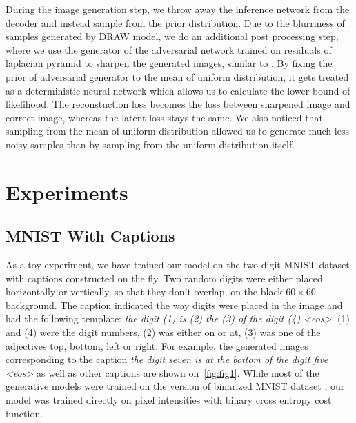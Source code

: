 \documentclass{article} %
\begin{document}
During the image generation step, we throw away the inference network from the decoder and instead sample from the prior distribution. Due to the blurriness of samples generated by DRAW model, we do an additional post processing step, where we use the generator of the adversarial network trained on residuals of laplacian pyramid to sharpen the generated images, similar to \citep{denton_lapgan}. By fixing the prior of adversarial generator to the mean of uniform distribution, it gets treated as a deterministic neural network which allows us to calculate the lower bound of likelihood. The reconstuction loss becomes the loss between sharpened image and correct image, whereas the latent loss stays the same. We also noticed that sampling from the mean of uniform distribution allowed us to generate much less noisy samples than by sampling from the uniform distribution itself.  

\section{Experiments}
\subsection{MNIST With Captions}
As a toy experiment, we have trained our model on the two digit MNIST dataset with captions constructed on the fly. Two random digits were either placed horizontally or vertically, so that they don't overlap, on the black $60 \times 60$ background. The caption indicated the way digits were placed in the image and had the following template: \textit{the digit (1) is (2) the (3) of the digit (4) \textless eos\textgreater}. (1) and (4) were the digit numbers, (2) was either on or at, (3) was one of the adjectives top, bottom, left or right. For example, the generated images corresponding to the caption \textit{the digit seven is at the bottom of the digit five \textless eos\textgreater} as well as other captions are shown on~\ref{fig:fig1}. While most of the generative models were trained on the version of binarized MNIST dataset \citep{russ_binarizedmnist}, our model was trained directly on pixel intensities with binary cross entropy cost function.
\end{document}
